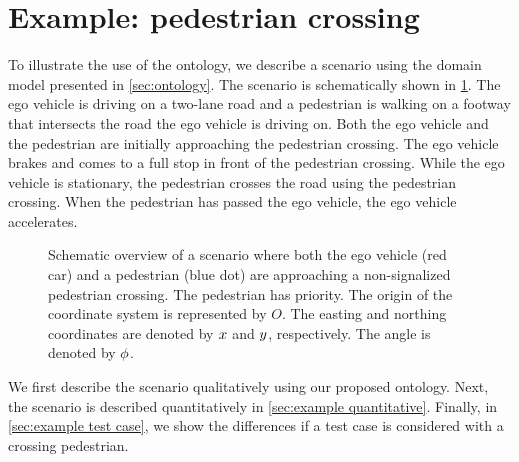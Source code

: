 \section{Example: pedestrian crossing}
\label{sec:example}

To illustrate the use of the ontology, we describe a scenario using the domain model presented in \cref{sec:ontology}. The scenario is schematically shown in \cref{fig:scenario overview}. The ego vehicle is driving on a two-lane road and a pedestrian is walking on a footway that intersects the road the ego vehicle is driving on. Both the ego vehicle and the pedestrian are initially approaching the pedestrian crossing. The ego vehicle brakes and comes to a full stop in front of the pedestrian crossing. While the ego vehicle is stationary, the pedestrian crosses the road using the pedestrian crossing. When the pedestrian has passed the ego vehicle, the ego vehicle accelerates.

\setlength{\figurewidth}{\linewidth}
\begin{figure}
	\centering
	
	\caption{Schematic overview of a scenario where both the ego vehicle (red car) and a pedestrian (blue dot) are approaching a non-signalized pedestrian crossing. The pedestrian has priority. The origin of the coordinate system is represented by $O$. The easting and northing coordinates are denoted by $x$ and $y$, respectively. The angle is denoted by $\phi$.}
	\label{fig:scenario overview}
\end{figure}

\cbstart
We first describe the scenario qualitatively using our proposed ontology. Next, the scenario is described quantitatively in \cref{sec:example quantitative}. Finally, in \cref{sec:example test case}, we show the differences if a test case is considered with a crossing pedestrian.

